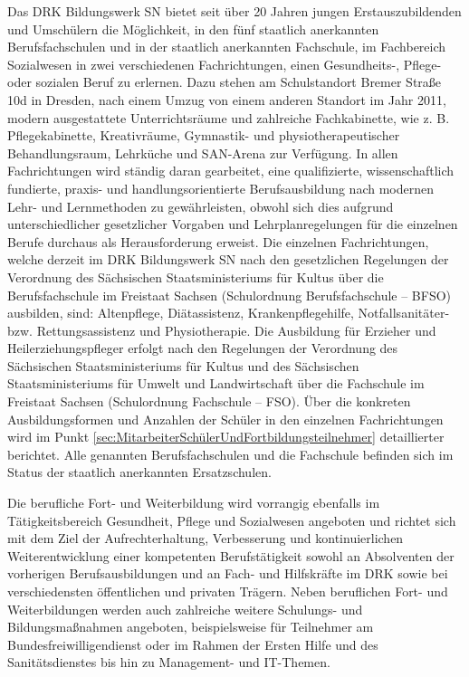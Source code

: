 Das DRK Bildungswerk SN bietet seit über 20 Jahren jungen Erstauszubildenden und Umschülern die Möglichkeit, in den fünf staatlich anerkannten Berufsfachschulen und in der staatlich anerkannten Fachschule, im Fachbereich Sozialwesen in zwei verschiedenen Fachrichtungen, einen Gesundheits-, Pflege- oder sozialen Beruf zu erlernen. Dazu stehen am Schulstandort Bremer Straße 10d in Dresden, nach einem Umzug von einem anderen Standort im Jahr 2011, modern ausgestattete Unterrichtsräume und zahlreiche Fachkabinette, wie z. B. Pflegekabinette, Kreativräume, Gymnastik- und physiotherapeutischer Behandlungsraum, Lehrküche und SAN-Arena zur Verfügung. In allen Fachrichtungen wird ständig daran gearbeitet, eine qualifizierte, wissenschaftlich fundierte, praxis- und handlungsorientierte Berufsausbildung nach modernen Lehr- und Lernmethoden zu gewährleisten, obwohl sich dies aufgrund unterschiedlicher gesetzlicher Vorgaben und Lehrplanregelungen für die einzelnen Berufe durchaus als Herausforderung erweist. Die einzelnen Fachrichtungen, welche derzeit im DRK Bildungswerk SN nach den gesetzlichen Regelungen der Verordnung des Sächsischen Staatsministeriums für Kultus über die Berufsfachschule im Freistaat Sachsen (Schulordnung Berufsfachschule -- BFSO) ausbilden, sind: Altenpflege, Diätassistenz, Krankenpflegehilfe, Notfallsanitäter- bzw. Rettungsassistenz und Physiotherapie. Die Ausbildung für Erzieher und Heilerziehungspfleger erfolgt nach den Regelungen der Verordnung des Sächsischen Staatsministeriums für Kultus und des Sächsischen Staatsministeriums für Umwelt und Landwirtschaft über die Fachschule im Freistaat Sachsen (Schulordnung Fachschule -- FSO). Über die konkreten Ausbildungsformen und Anzahlen der Schüler in den einzelnen Fachrichtungen wird im Punkt \ref{sec:MitarbeiterSchülerUndFortbildungsteilnehmer} detaillierter berichtet. Alle genannten Berufsfachschulen und die Fachschule befinden sich im Status der staatlich anerkannten Ersatzschulen.

Die berufliche Fort- und Weiterbildung wird vorrangig ebenfalls im Tätigkeitsbereich Gesundheit, Pflege und Sozialwesen angeboten und richtet sich mit dem Ziel der Aufrechterhaltung, Verbesserung und kontinuierlichen Weiterentwicklung einer kompetenten Berufstätigkeit sowohl an Absolventen der vorherigen Berufsausbildungen und an Fach- und Hilfskräfte im DRK sowie bei verschiedensten öffentlichen und privaten Trägern. Neben beruflichen Fort- und Weiterbildungen werden auch zahlreiche weitere Schulungs- und Bildungsmaßnahmen angeboten, beispielsweise für Teilnehmer am Bundesfreiwilligendienst oder im Rahmen der Ersten Hilfe und des Sanitätsdienstes bis hin zu Man\-age\-ment- und IT-Themen. 

